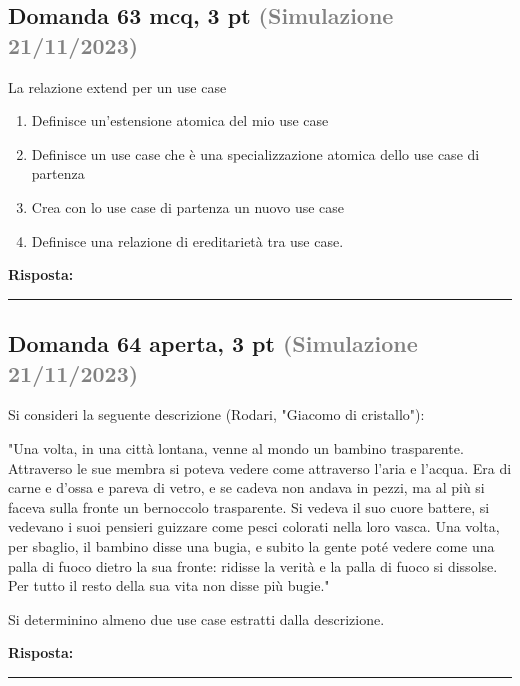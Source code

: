 \documentclass[a4paper,11pt]{article}
\begin{document}
\subsection*{Domanda 63 \hfill {\small mcq, 3 pt \textcolor{gray}{(Simulazione 21/11/2023)}}}
La relazione extend per un use case

\begin{enumerate}[label=\alph*)]
\item Definisce un'estensione atomica del mio use case
\item Definisce un use case che è una specializzazione atomica dello use case di partenza
\item Crea con lo use case di partenza un nuovo use case
\item Definisce una relazione di ereditarietà tra use case.
\end{enumerate}
\vspace{0.2cm}
\noindent\textbf{Risposta:}\par
\vspace{1.5cm}\hrule


\subsection*{Domanda 64 \hfill {\small aperta, 3 pt \textcolor{gray}{(Simulazione 21/11/2023)}}}
\begin{tcolorbox}[colback=gray!8,colframe=gray!50,title=Contesto]
Si consideri la seguente descrizione (Rodari, "Giacomo di cristallo"):

"Una volta, in una città lontana, venne al mondo un bambino trasparente. Attraverso le sue membra si poteva vedere come attraverso l'aria e l'acqua. Era di carne e d'ossa e pareva di vetro, e se cadeva non andava in pezzi, ma al più si faceva sulla fronte un bernoccolo trasparente. Si vedeva il suo cuore battere, si vedevano i suoi pensieri guizzare come pesci colorati nella loro vasca. Una volta, per sbaglio, il bambino disse una bugia, e subito la gente poté vedere come una palla di fuoco dietro la sua fronte: ridisse la verità e la palla di fuoco si dissolse. Per tutto il resto della sua vita non disse più bugie."
\end{tcolorbox}
Si determinino almeno due use case estratti dalla descrizione.

\vspace{0.2cm}
\noindent\textbf{Risposta:}\par
\vspace{4cm}\hrule
\end{document}
